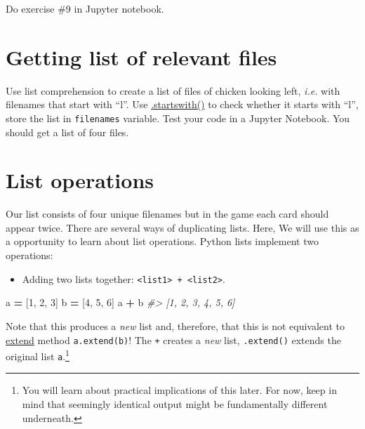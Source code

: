 \documentclass[
]{book}
\newenvironment{Shaded}{\begin{snugshade}}{\end{snugshade}}
\newcommand{\CommentTok}[1]{\textcolor[rgb]{0.56,0.35,0.01}{\textit{#1}}}
\newcommand{\DecValTok}[1]{\textcolor[rgb]{0.00,0.00,0.81}{#1}}
\newcommand{\NormalTok}[1]{#1}
\newcommand{\OperatorTok}[1]{\textcolor[rgb]{0.81,0.36,0.00}{\textbf{#1}}}
\providecommand{\tightlist}{%
  \setlength{\itemsep}{0pt}\setlength{\parskip}{0pt}}
\begin{document}
Do exercise \#9 in Jupyter notebook.

\hypertarget{getting-list-of-relevant-files}{%
\section{Getting list of relevant files}\label{getting-list-of-relevant-files}}

Use list comprehension to create a list of files of chicken looking left, \emph{i.e.} with filenames that start with ``l''. Use \href{https://docs.python.org/3/library/stdtypes.html\#str.startswith}{.startswith()} to check whether it starts with ``l'', store the list in \texttt{filenames} variable. Test your code in a Jupyter Notebook. You should get a list of four files.

\hypertarget{list-operations}{%
\section{List operations}\label{list-operations}}

Our list consists of four unique filenames but in the game each card should appear twice. There are several ways of duplicating lists. Here, We will use this as a opportunity to learn about list operations. Python lists implement two operations:

\begin{itemize}
\tightlist
\item
  Adding two lists together: \texttt{\textless{}list1\textgreater{}\ +\ \textless{}list2\textgreater{}}.
\end{itemize}

\begin{Shaded}
\begin{Highlighting}[]
\NormalTok{a }\OperatorTok{=}\NormalTok{ [}\DecValTok{1}\NormalTok{, }\DecValTok{2}\NormalTok{, }\DecValTok{3}\NormalTok{]}
\NormalTok{b }\OperatorTok{=}\NormalTok{ [}\DecValTok{4}\NormalTok{, }\DecValTok{5}\NormalTok{, }\DecValTok{6}\NormalTok{]}
\NormalTok{a }\OperatorTok{+}\NormalTok{ b}
\CommentTok{\#\textgreater{} [1, 2, 3, 4, 5, 6]}
\end{Highlighting}
\end{Shaded}

Note that this produces a \emph{new} list and, therefore, that this is not equivalent to \href{https://docs.python.org/3/tutorial/datastructures.html\#more-on-lists}{extend} method \texttt{a.extend(b)}! The \texttt{+} creates a \emph{new} list, \texttt{.extend()} extends the original list \texttt{a}.\footnote{You will learn about practical implications of this later. For now, keep in mind that seemingly identical output might be fundamentally different underneath.}
\end{document}

